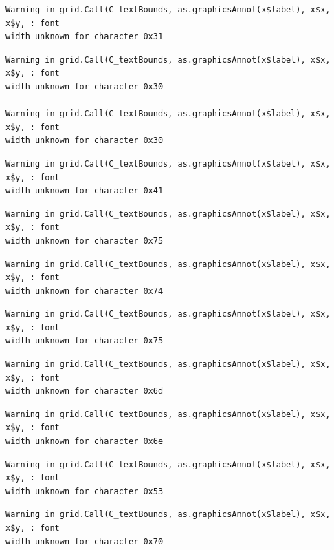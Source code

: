 \documentclass[
  letterpaper,
  DIV=11,
  numbers=noendperiod]{scrreprt}
\begin{document}
\begin{verbatim}
Warning in grid.Call(C_textBounds, as.graphicsAnnot(x$label), x$x, x$y, : font
width unknown for character 0x31
\end{verbatim}

\begin{verbatim}
Warning in grid.Call(C_textBounds, as.graphicsAnnot(x$label), x$x, x$y, : font
width unknown for character 0x30

Warning in grid.Call(C_textBounds, as.graphicsAnnot(x$label), x$x, x$y, : font
width unknown for character 0x30
\end{verbatim}

\begin{verbatim}
Warning in grid.Call(C_textBounds, as.graphicsAnnot(x$label), x$x, x$y, : font
width unknown for character 0x41
\end{verbatim}

\begin{verbatim}
Warning in grid.Call(C_textBounds, as.graphicsAnnot(x$label), x$x, x$y, : font
width unknown for character 0x75
\end{verbatim}

\begin{verbatim}
Warning in grid.Call(C_textBounds, as.graphicsAnnot(x$label), x$x, x$y, : font
width unknown for character 0x74
\end{verbatim}

\begin{verbatim}
Warning in grid.Call(C_textBounds, as.graphicsAnnot(x$label), x$x, x$y, : font
width unknown for character 0x75
\end{verbatim}

\begin{verbatim}
Warning in grid.Call(C_textBounds, as.graphicsAnnot(x$label), x$x, x$y, : font
width unknown for character 0x6d
\end{verbatim}

\begin{verbatim}
Warning in grid.Call(C_textBounds, as.graphicsAnnot(x$label), x$x, x$y, : font
width unknown for character 0x6e
\end{verbatim}

\begin{verbatim}
Warning in grid.Call(C_textBounds, as.graphicsAnnot(x$label), x$x, x$y, : font
width unknown for character 0x53
\end{verbatim}

\begin{verbatim}
Warning in grid.Call(C_textBounds, as.graphicsAnnot(x$label), x$x, x$y, : font
width unknown for character 0x70
\end{verbatim}
\end{document}

